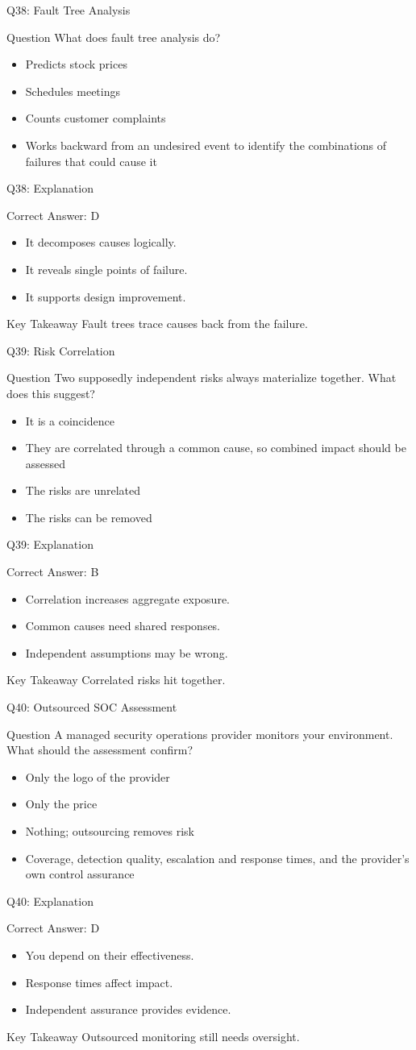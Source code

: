 \documentclass[aspectratio=169]{beamer}
\newcommand{\hq}[7]{%
	\begin{frame}{Q#1: #2}
		\begin{block}{Question}
			#3
		\end{block}
		\begin{itemize}
			#4
		\end{itemize}
	\end{frame}
	\begin{frame}{Q#1: Explanation}
		\begin{block}{Correct Answer: #5}
			\begin{itemize}
				#6
			\end{itemize}
		\end{block}
		\begin{alertblock}{Key Takeaway}
			#7
		\end{alertblock}
	\end{frame}
}
\begin{document}
	\hq{38}{Fault Tree Analysis}
	{What does fault tree analysis do?}
	{\item[\textbf{(A)}] Predicts stock prices
		\item[\textbf{(B)}] Schedules meetings
		\item[\textbf{(C)}] Counts customer complaints
		\item[\textbf{(D)}] Works backward from an undesired event to identify the combinations of failures that could cause it}
	{D}
	{\item It decomposes causes logically.
		\item It reveals single points of failure.
		\item It supports design improvement.}
	{Fault trees trace causes back from the failure.}

	\hq{39}{Risk Correlation}
	{Two supposedly independent risks always materialize together. What does this suggest?}
	{\item[\textbf{(A)}] It is a coincidence
		\item[\textbf{(B)}] They are correlated through a common cause, so combined impact should be assessed
		\item[\textbf{(C)}] The risks are unrelated
		\item[\textbf{(D)}] The risks can be removed}
	{B}
	{\item Correlation increases aggregate exposure.
		\item Common causes need shared responses.
		\item Independent assumptions may be wrong.}
	{Correlated risks hit together.}

	\hq{40}{Outsourced SOC Assessment}
	{A managed security operations provider monitors your environment. What should the assessment confirm?}
	{\item[\textbf{(A)}] Only the logo of the provider
		\item[\textbf{(B)}] Only the price
		\item[\textbf{(C)}] Nothing; outsourcing removes risk
		\item[\textbf{(D)}] Coverage, detection quality, escalation and response times, and the provider's own control assurance}
	{D}
	{\item You depend on their effectiveness.
		\item Response times affect impact.
		\item Independent assurance provides evidence.}
	{Outsourced monitoring still needs oversight.}
\end{document}
